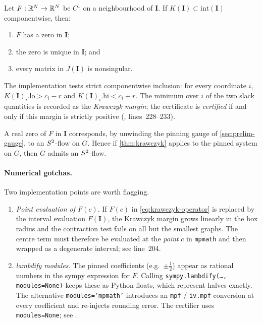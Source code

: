\begin{theorem}
\label{thm:krawczyk}
Let $F : \mathbb{R}^{N} \to \mathbb{R}^{N}$ be $C^{1}$ on a neighbourhood of
$\mathbf{I}$. If
$K(\mathbf{I}) \subset \mathrm{int}(\mathbf{I})$ componentwise, then:
\begin{enumerate}[label=(\roman*)]
  \item $F$ has a zero in $\mathbf{I}$;
  \item the zero is unique in $\mathbf{I}$; and
  \item every matrix in $J(\mathbf{I})$ is nonsingular.
\end{enumerate}
\end{theorem}

The implementation tests strict componentwise inclusion: for every
coordinate $i$, $K(\mathbf{I})_i.\text{lo} > c_i - r$ and
$K(\mathbf{I})_i.\text{hi} < c_i + r$. The minimum over $i$ of the
two slack quantities is recorded as the \emph{Krawczyk margin}; the
certificate is \emph{certified} if and only if this margin is
strictly positive (,
lines~228--233).

\begin{corollary}
\label{cor:s2-flow-from-zero}
A real zero of $F$ in $\mathbf{I}$ corresponds, by unwinding the
pinning gauge of \cref{sec:prelim-gauge}, to an $S^{2}$-flow on $G$.
Hence if \cref{thm:krawczyk} applies to the pinned system on $G$,
then $G$ admits an $S^{2}$-flow.
\end{corollary}

\paragraph{Numerical gotchas.}
Two implementation points are worth flagging.
\begin{enumerate}[label=(\roman*)]
  \item \emph{Point evaluation of $F(c)$.} If $F(c)$ in
        \cref{eq:krawczyk-operator} is replaced by the interval
        evaluation $F(\mathbf{I})$, the Krawczyk margin grows
        linearly in the box radius and the contraction test fails on
        all but the smallest graphs. The centre term must therefore
        be evaluated at the \emph{point} $c$ in \texttt{mpmath} and
        then wrapped as a degenerate interval; see
         line~204.
  \item \emph{lambdify modules.} The pinned coefficients
        (e.g.\ $\pm\tfrac{1}{2}$) appear as rational numbers in the
        sympy expression for $F$. Calling
        \texttt{sympy.lambdify(\ldots, modules=None)} keeps these as
        Python floats, which represent halves exactly. The
        alternative \texttt{modules='mpmath'} introduces an
        \texttt{mpf} / \texttt{iv.mpf} conversion at every coefficient
        and re-injects rounding error. The certifier uses
        \texttt{modules=None}; see .
\end{enumerate}

